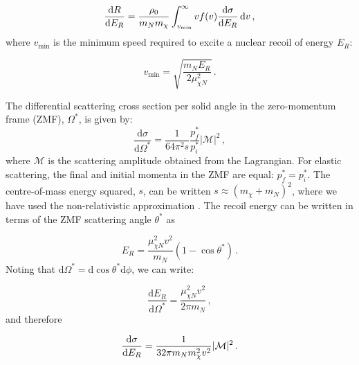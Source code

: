 \begin{equation}
\frac{\mathrm{d}R}{\mathrm{d}E_R} =  \frac{\rho_0}{m_N m_\chi} \int_{v_\textrm{min}}^{\infty} v f(v) \frac{\mathrm{d}\sigma}{\mathrm{d}E_R} \, \mathrm{d}v\,,
\end{equation}
where $v_\textrm{min}$ is the minimum speed required to excite a nuclear recoil of energy $E_R$:

\begin{equation}
v_\textrm{min} = \sqrt{\frac{m_N E_R}{2 \mu_{\chi N}^2}}\,.
\end{equation}

The differential scattering cross section per solid angle in the zero-momentum frame (ZMF), \(\Omega^*\), is given by:
\begin{equation}
\frac{\textrm{d}\sigma}{\textrm{d}\Omega^*} = \frac{1}{64 \pi^2 s} \frac{p_f^*}{p_i^*} |\mathcal{M}|^2 \,,
\end{equation}
where $\mathcal{M}$ is the scattering amplitude obtained from the Lagrangian. For elastic scattering, the final and initial momenta in the ZMF are equal: \(p_f^* = p_i^*\). The centre-of-mass energy squared, \(s\), can be written \(s \approx (m_\chi + m_N)^2\), where we have used the non-relativistic approximation . The recoil energy can be written in terms of the ZMF scattering angle $\theta^*$ as \cite{Cerdeno:2010}

\begin{equation}
E_R = \frac{\mu_{\chi N }^2 v^2}{m_N} (1-\cos\theta^*)\,.
\end{equation}
Noting that $\textrm{d}\Omega^* = \textrm{d}\cos\theta^*\textrm{d}\phi$, we can write:

\begin{equation}
\frac{\textrm{d}E_R}{\textrm{d}\Omega^*} = \frac{\mu_{\chi N}^2 v^2}{2\pi m_N}\,,
\end{equation}
and therefore

\begin{equation}
\frac{\mathrm{d}\sigma}{\mathrm{d}E_R} = \frac{1}{32\pi m_N m_\chi^2 v^2}|\mathcal{M}|^2\,.
\end{equation}

